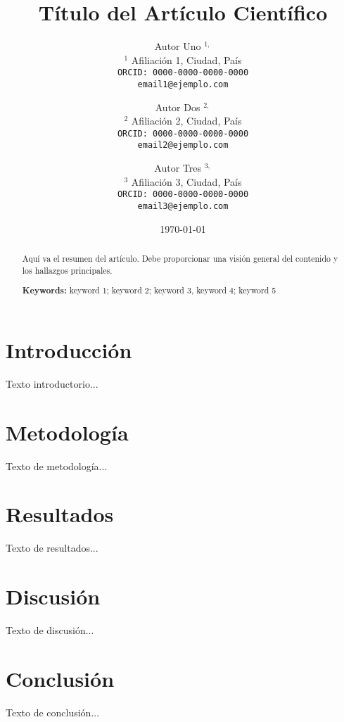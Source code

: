 \documentclass[a4paper,12pt]{article}
\title{\textbf{Título del Artículo Científico}}
\author{
Autor Uno $^{1,}$ \\
\small $^1$ Afiliación 1, Ciudad, País \\
\small \texttt{ORCID: 0000-0000-0000-0000} \\
\small \texttt{email1@ejemplo.com} 
\and
Autor Dos $^{2,}$ \\
\small $^2$ Afiliación 2, Ciudad, País \\
\small \texttt{ORCID: 0000-0000-0000-0000} \\
\small \texttt{email2@ejemplo.com} 
\and
Autor Tres $^{3,}$\\
\small $^3$ Afiliación 3, Ciudad, País \\
\small \texttt{ORCID: 0000-0000-0000-0000} \\
\small \texttt{email3@ejemplo.com} 
}
\date{\today}
\begin{document}
\maketitle

\begin{abstract}
Aquí va el resumen del artículo. Debe proporcionar una visión general del contenido y los hallazgos principales.

\textbf{Keywords:} keyword 1; keyword 2; keyword 3, keyword 4; keyword 5

\end{abstract}

\section{Introducción}
Texto introductorio...\cite{Autor2020}

\section{Metodología}
Texto de metodología...

\section{Resultados}
Texto de resultados...

\section{Discusión}
Texto de discusión...

\section{Conclusión}
Texto de conclusión...


\printbibliography %
\end{document}
